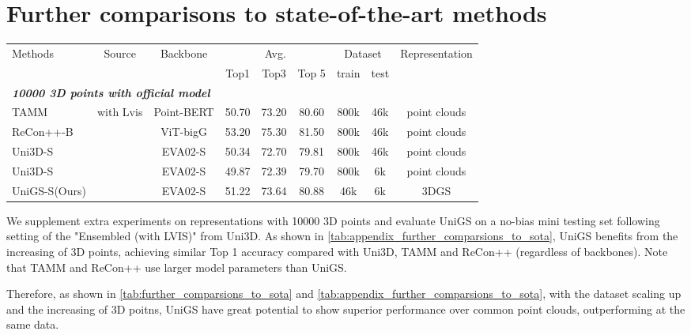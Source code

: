 \section{Further comparisons to state-of-the-art methods}
\label{sec:appendix_further_comparisons_to_sota_methods}
\begin{table*}[t]
		\centering
  \addtolength{\tabcolsep}{-0.5pt}
  \caption{\textbf{Comparisons to state-of-the-art methods with the same data on Objaverse-LVIS zero-shot classification. Avg.: }the mean average classification accuracy.}
 \begin{tabularx}{\textwidth}{ l | c c | c c c | c c | c }
\toprule
\multirow{2}{*}{Methods} & \multirow{2}{*}{Source} & \multirow{2}{*}{Backbone}  & \multicolumn{3}{c|}{Avg.} & \multicolumn{2}{c|}{Dataset} & \multirow{2}{*}{Representation} \\
  & & & Top1 & Top3 & Top 5 & train & test & \\

 \midrule  \midrule
    \multicolumn{3}{l}{\textit{\textbf{10000 3D points with official model}}} \\
    \midrule
TAMM & \multirow{5}{*}{with Lvis}  & Point-BERT & 50.70 & 73.20 & 80.60 & 800k & 46k & point clouds\\
ReCon++-B & & ViT-bigG & 53.20 & 75.30 & 81.50 & 800k & 46k & point clouds \\
Uni3D-S & & EVA02-S & 50.34 & 72.70 & 79.81 & 800k & 46k & point clouds \\
Uni3D-S & & EVA02-S & 49.87 & 72.39 & 79.70	& 800k & 6k & point clouds \\
UniGS-S(Ours) & & EVA02-S & 51.22 & 73.64 & 80.88 & 46k & 6k & 3DGS\\
\bottomrule
\end{tabularx}
  \label{tab:appendix_further_comparsions_to_sota}
  \vspace{-3mm}
\end{table*}

We supplement extra experiments on representations with 10000 3D points and evaluate UniGS on a no-bias mini testing set following setting of the "Ensembled (with LVIS)" from Uni3D. As shown in \cref{tab:appendix_further_comparsions_to_sota}, UniGS benefits from the increasing of 3D points, achieving similar Top 1 accuracy compared with Uni3D, TAMM and ReCon++ (regardless of backbones). Note that
TAMM and ReCon++ use larger model parameters than UniGS.

Therefore, as shown in \cref{tab:further_comparsions_to_sota} and \cref{tab:appendix_further_comparsions_to_sota}, with the dataset scaling up and the increasing of 3D poitns, UniGS have great potential to show superior performance over common point clouds, outperforming at the same data.

